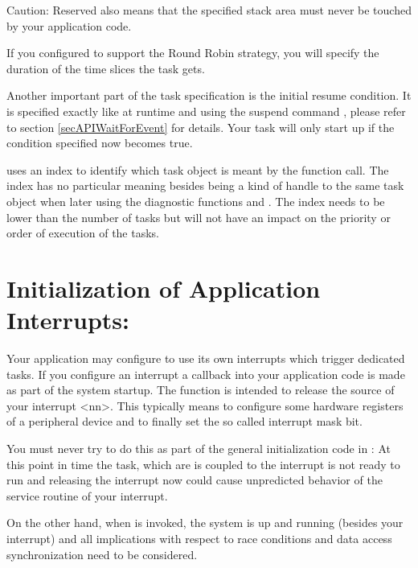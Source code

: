 Caution: Reserved also means that the specified stack area must never be
touched by your application code.

If you configured \rtos{} to support the Round Robin strategy, you will
specify the duration of the time slices the task gets.

Another important part of the task specification is the initial resume
condition. It is specified exactly like at runtime and using the suspend
command , please refer to section
\ref{secAPIWaitForEvent} for details. Your task will only start up if the
condition specified now becomes true.

 uses an index to identify which task object is
meant by the function call. The index has no particular meaning besides
being a kind of handle to the same task object when later using the
diagnostic functions  and
. The index needs to be lower than the number
of tasks but will not have an impact on the priority or order of execution
of the tasks.


\section{Initialization of Application Interrupts:
}

Your application may configure \rtos{} to use its own interrupts which
trigger dedicated tasks. If you configure an interrupt a callback into
your application code is made as part of the system startup. The function
 is intended to
release the source of your interrupt \textless nn\textgreater. This
typically means to configure some hardware registers of a peripheral
device and to finally set the so called interrupt mask bit.

You must never try to do this as part of the general initialization
code in : At this point in time the task, which are is
coupled to the interrupt is not ready to run and releasing the interrupt
now could cause unpredicted behavior of the service routine of your
interrupt.  

On the other hand, when  is invoked, the \rtos{} system is up and running (besides
your interrupt) and all implications with respect to race conditions and
data access synchronization need to be considered.

